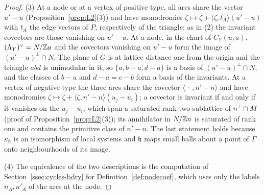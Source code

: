 \begin{proof}
(3) At a node or at a vertex of positive type, all arcs share the vector $u'-u$ (Proposition~\ref{prop:L2}(3)) and have
monodromies $\zeta\mapsto\zeta+\langle\zeta,t_A\rangle(u'-u)$ with $t_A$ the edge vectors of $P$, respectively of
the triangle; as in (2) the invariant covectors are those vanishing on $u'-u$. At a node, in the chart of $C_Y(u,a)$,
$(\Lambda_Y)^\vee=N/\mathbb Z a$ and the covectors vanishing on $u'-u$ form the image of $(u'-u)^\perp\cap N$. The plane of $G$ is
at lattice distance one from the origin and the triangle $abd$ is unimodular in it, so $\{a,b-a,d-a\}$ is a basis of
$(u'-u)^\perp\cap N$, and the classes of $b-a$ and $d-a=c-b$ form a basis of the invariants. At a vertex of negative type
the three arcs share the covector $\langle\,\cdot\,,n'-n\rangle$ and have monodromies $\zeta\mapsto\zeta+\langle
\zeta,n'-n\rangle(u_j-u_i)$; a covector is invariant if and only if it vanishes on the $u_j-u_i$, which span a saturated
rank-two sublattice of $n^\perp\cap M$ (proof of Proposition~\ref{prop:L2}(3)); its annihilator in $N/\mathbb Z n$ is saturated
of rank one and contains the primitive class of $n'-n$. The last statement holds because $\kappa_{\mathfrak h}$ is an isomorphism of local
systems and $\mathfrak h$ maps small balls about a point of $\Gamma$ onto neighbourhoods of its image.

(4) The equivalence of the two descriptions is the computation of Section~\ref{ssec:cycles-bdry} for
Definition~\ref{def:nodecoef}, which uses only the labels $n_A,n'_A$ of the arcs at the node.
\end{proof}

